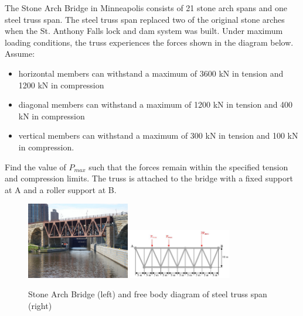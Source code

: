 
The Stone Arch Bridge in Minneapolis consists of 21 stone arch spans and one steel truss span. The steel truss
span replaced two of the original stone arches when the St. Anthony Falls lock and dam system was built.
Under maximum loading conditions, the truss experiences the forces shown in the diagram below. Assume:
\begin{itemize}
  \item horizontal members can withstand a maximum of 3600 kN in tension and 1200 kN in compression
  \item diagonal members can withstand a maximum of 1200 kN in tension and 400 kN in compression
  \item vertical members can withstand a maximum of 300 kN in tension and 100 kN in compression.
\end{itemize}

Find the value of $P_{max}$ such that the forces remain within the specified tension and compression limits. The truss is attached
to the bridge with a fixed support at A and a roller support at B.

\begin{figure}[ht!]
  \centering
  \includegraphics[width=0.4\textwidth,
	           height=0.3\textheight,
		   keepaspectratio]{figa.png}
  \includegraphics[width=0.4\textwidth,
	           height=0.3\textheight,
		   keepaspectratio]{figb.png}
  \caption*{Stone Arch Bridge (left) and free body diagram of steel truss span (right)}
\end{figure}

